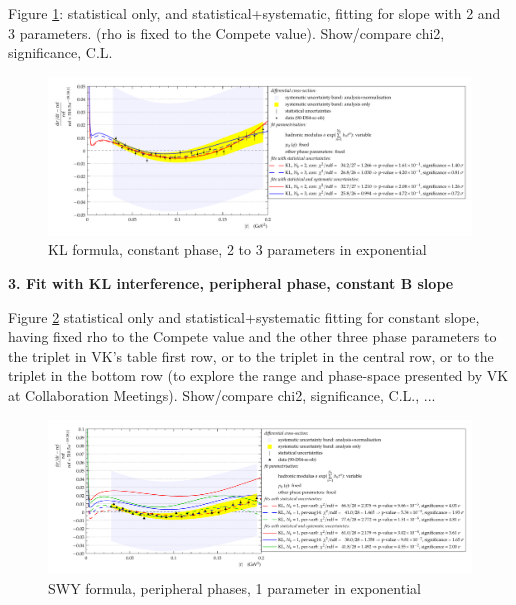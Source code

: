 Figure \ref{fig:90,KL,con,2-3}: statistical only, and statistical+systematic, fitting for slope with 2 and 3 parameters. (rho is
fixed to the Compete value). Show/compare chi2, significance, C.L.

\begin{figure}
\begin{center}
\includegraphics[width=18cm]{simone/90/KL,con,2-3,stat-stat+syst.pdf}
\vskip-3mm
\caption{KL formula, constant phase, 2 to 3 parameters in exponential}
\label{fig:90,KL,con,2-3}
\end{center}
\end{figure}

{\bf 3. Fit with KL interference, peripheral phase, constant B slope}

Figure \ref{fig:90,KL,per,1}
statistical only and statistical+systematic fitting for constant slope, having fixed rho to the
Compete value and the other three phase parameters to the triplet in VK’s table first
row, or to the triplet in the central row, or to the triplet in the bottom row (to explore the
range and phase-space presented by VK at Collaboration Meetings).
Show/compare chi2, significance, C.L., ...

\begin{figure}
\begin{center}
\includegraphics[width=18cm]{simone/90/KL,per-var048,1,stat-stat+syst.pdf}
\vskip-3mm
\caption{SWY formula, peripheral phases, 1 parameter in exponential}
\label{fig:90,KL,per,1}
\end{center}
\end{figure}


